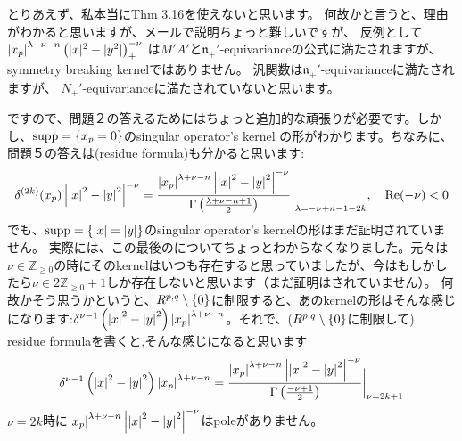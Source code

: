 \documentclass[10pt]{article} %
\title{}
\author{}
\begin{document}
\begin{CJK}{UTF8}{min}
\maketitle
とりあえず、私本当にThm 3.16を使えないと思います。
何故かと言うと、理由がわかると思いますが、メールで説明ちょっと難しいですが、
反例として $\left|x_p\right|^{\lambda+\nu-n}\left(|x|^2-|y^2|\right)^{-\nu}_+$
は$M'A'$と$\mathfrak{n_+'}$-equivarianceの公式に満たされますが、
symmetry breaking kernelではありません。
汎関数は$\mathfrak{n}_+'$-equivarianceに満たされますが、
$N_+'$-equivarianceに満たされていないと思います。

ですので、問題２の答えるためにはちょっと追加的な頑張りが必要です。しかし、$\operatorname{supp}=\left\{ x_p=0 \right\}$のsingular operator's kernel
の形がわかります。ちなみに、問題５の答えは(residue formula)も分かると思います:
\[\delta^{ (2k) }(x_p)\left| \left| x \right|^2-\left|y\right|^2 \right|^{ -\nu }=\frac{\left| x_p \right|^{ \lambda+\nu-n }\left| 
\left| x \right|^2-\left| y \right|^2\right|^{ -\nu }}{ \Gamma\left( \frac{ \lambda+\nu-n+1}{2} \right) }\bigg|_{ \lambda=-\nu+n-1-2k },\quad\operatorname{Re}(-\nu)<0\]
でも、$\operatorname{supp}=\left\{ \left| x \right|=\left| y \right| \right\}$のsingular operator's kernelの形はまだ証明されていません。
実際には、この最後のについてちょっとわからなくなりました。元々は$\nu\in\mathbb{Z}_{ \geq0 }$の時にそのkernelはいつも存在すると思っていましたが、今はもしかしたら$\nu\in2\mathbb{Z}_{ \geq0 }+1$しか存在しないと思います（まだ証明はされていません）。
何故かそう思うかというと、$R^{ p,q }\setminus\left\{ 0 \right\}$に制限すると、あのkernelの形はそんな感じになります:$\delta^{ \nu-1 }\left( \left| x \right|^2-\left| y \right|^2 \right)\left| x_p \right|^{ \lambda+\nu-n }$。それで、($R^{ p,q }\setminus\left\{ 0 \right\}$に制限して)
residue formulaを書くと,そんな感じになると思います
\[\delta^{ \nu-1 }\left( \left| x \right|^2-\left| y \right|^2 \right)\left| x_p \right|^{ \lambda+\nu-n }=
\frac{\left| x_p \right|^{ \lambda+\nu-n }\left| 
	\left| x \right|^2-\left| y \right|^2\right|^{ -\nu }}{ \Gamma\left( \frac{ -\nu+1}{2} \right) }\bigg|_{ \nu=2k+1}
\]
$\nu=2k$時に${\left| x_p \right|^{ \lambda+\nu-n }\left| 
	\left| x \right|^2-\left| y \right|^2\right|^{ -\nu }}$はpoleがありません。

\end{CJK}
\end{document}
